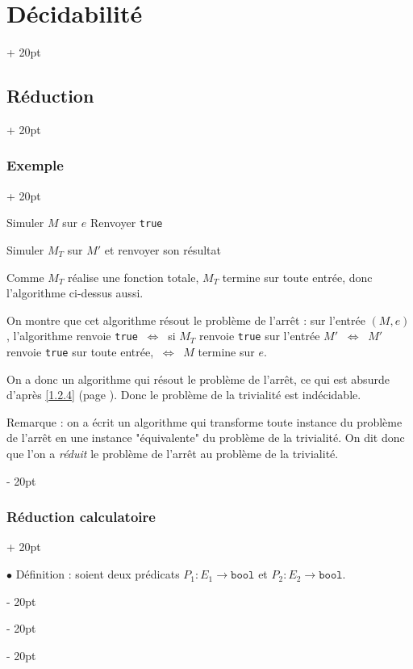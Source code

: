 \documentclass[a4paper, 12pt, twoside]{article}
\newcommand{\ssi}{\ \Leftrightarrow \ }
\newcommand{\ind}[1][20pt]{\advance\leftskip + #1}
\newcommand{\deind}[1][20pt]{\advance\leftskip - #1}
\newenvironment{indt}[2][20pt]{#2 \par \ind[#1]}{\par \deind} %
\begin{document}
\begin{indt}{\section{Décidabilité}}
\begin{indt}{\subsection{Réduction}}
\begin{indt}{\subsubsection{Exemple}}
\begin{algoBox}
\begin{algorithm}[H]
\begin{algorithm}[H]
                            \BlankLine

                            Simuler $M$ sur $e$\;
                            Renvoyer \texttt{true}\;

                            \caption{$M'$}
                        \end{algorithm}
                    
                        \BlankLine
                    
                        Simuler $M_T$ sur $M'$ et renvoyer son résultat\;
                    \end{algorithm}
                \end{algoBox}

                Comme $M_T$ réalise une fonction totale, $M_T$ termine sur toute entrée, donc l'algorithme ci-dessus aussi.

                On montre que cet algorithme résout le problème de l'arrêt : sur l'entrée $(M, e)$, l'algorithme renvoie \texttt{true}
                $\ssi$ si $M_T$ renvoie \texttt{true} sur l'entrée $M'$
                $\ssi$ $M'$ renvoie \texttt{true} sur toute entrée,
                $\ssi$ $M$ termine sur $e$.

                On a donc un algorithme qui résout le problème de l'arrêt, ce qui est absurde d'après \ref{1.2.4} (page \pageref{1.2.4}).
                Donc le problème de la trivialité est indécidable.

                \vspace{12pt}
                
                Remarque : on a écrit un algorithme qui transforme toute instance du problème de l'arrêt en une instance "équivalente" du problème de la trivialité.
                On dit donc que l'on a \emph{réduit} le problème de l'arrêt au problème de la trivialité.
            \end{indt}

            \vspace{12pt}
            
            \begin{indt}{\subsubsection{Réduction calculatoire}}
                \label{1.3.3}

                $\bullet$ Définition :
                soient deux prédicats $P_1 : E_1 \longrightarrow \mathtt{bool}$ et $P_2 : E_2 \longrightarrow \mathtt{bool}$.


\end{indt}
\end{indt}
\end{indt}
\end{document}
